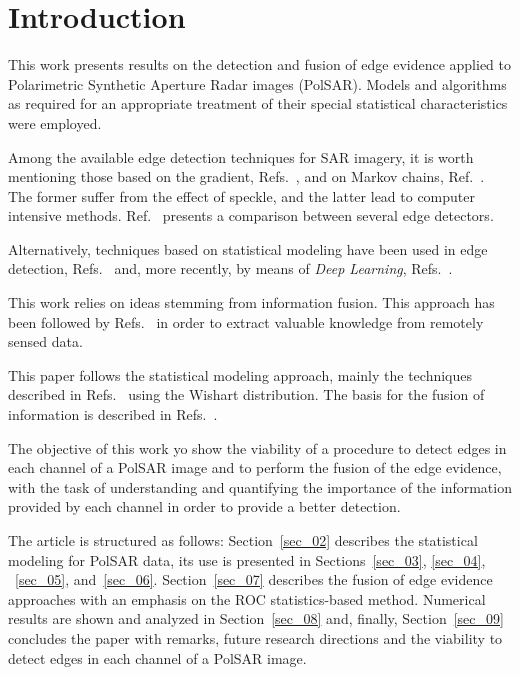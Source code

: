 \documentclass[conference]{IEEEtran}
\begin{document}
\section{Introduction}\label{sec_01}

This work presents results on the detection and fusion of edge evidence applied to Polarimetric Synthetic Aperture Radar images (PolSAR). Models and algorithms as required for an appropriate treatment of their special statistical characteristics were employed.

Among the available edge detection techniques for SAR imagery, it is worth mentioning those based on the gradient, Refs.~\cite{tlb, obw, flmc, fyf}, and on Markov chains, Ref.~\cite{bf}. The former suffer from the effect of speckle, and the latter lead to computer intensive methods. Ref.~\cite{gfn} presents a comparison between several edge detectors. 

Alternatively, techniques based on statistical modeling have been used in edge detection, Refs.~\cite{gmbf, fbgm, horrit, gfn} and, more recently, by means of \textit{Deep Learning}, Refs.~\cite{bac, ztmxzxf, tabmm, xstz}.

This work relies on ideas stemming from information fusion.
This approach has been followed by Refs.~\cite{sglmla,sg} in order to extract valuable knowledge from remotely sensed data.

This paper follows the statistical modeling approach, mainly the techniques described in Refs.~\cite{fbgm, nhfc} using the Wishart distribution.
The basis for the fusion of information is described in Refs.~\cite{mit, sg}. 

The objective of this work yo show the viability of a procedure to detect edges in each channel of a PolSAR image and to perform the fusion of the edge evidence, with the task of understanding and quantifying the importance of the information provided by each channel in order to provide a better detection.

The article is structured as follows: 
Section~\ref{sec_02} describes the statistical modeling for PolSAR data, 
its use is presented in Sections~\ref{sec_03}, \ref{sec_04}, ~\ref{sec_05}, and~\ref{sec_06}.
Section~\ref{sec_07} describes the fusion of edge evidence approaches with an emphasis on the ROC statistics-based method.
Numerical results are shown and analyzed in Section~\ref{sec_08} and, finally, Section~\ref{sec_09} concludes the paper with remarks, future research directions and the viability  to detect edges in each channel of a PolSAR image.
\end{document}

